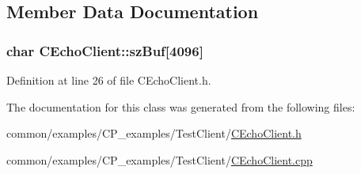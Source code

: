 \subsection{\-Member \-Data \-Documentation}
\hypertarget{class_c_echo_client_a59d25bf6a4e77c56bbbde61efb795c42}{
\subsubsection[{sz\-Buf}]{\setlength{\rightskip}{0pt plus 5cm}char {\bf \-C\-Echo\-Client\-::sz\-Buf}\mbox{[}4096\mbox{]}}}\label{class_c_echo_client_a59d25bf6a4e77c56bbbde61efb795c42}


\-Definition at line 26 of file \-C\-Echo\-Client.\-h.



\-The documentation for this class was generated from the following files\-:\begin{DoxyCompactItemize}
\item 
common/examples/\-C\-P\-\_\-examples/\-Test\-Client/\hyperlink{_c_echo_client_8h}{\-C\-Echo\-Client.\-h}\item 
common/examples/\-C\-P\-\_\-examples/\-Test\-Client/\hyperlink{_c_echo_client_8cpp}{\-C\-Echo\-Client.\-cpp}\end{DoxyCompactItemize}
